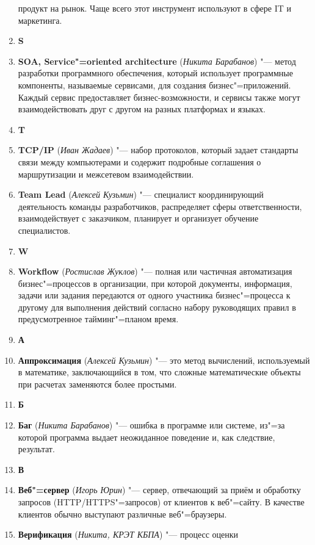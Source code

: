 \documentclass[a4paper, 14 pt]{extarticle}
\begin{document}
\begin{enumerate}
    продукт на рынок. Чаще всего этот инструмент используют в сфере IT и 
    маркетинга. 
    \item[] \textbf{S}
    \item \textbf{SOA, Service"=oriented architecture} 
    (\textit{Никита Барабанов}) "---  метод разработки программного обеспечения,
    который использует программные компоненты, называемые сервисами, для 
    создания бизнес"=приложений. Каждый сервис предоставляет бизнес-возможности,
    и сервисы также могут взаимодействовать друг с другом на разных платформах и
    языках.
    \item[] \textbf{T}
    \item \textbf{TCP/IP} (\textit{Иван Жадаев}) "--- набор протоколов, который 
    задает стандарты связи между компьютерами и содержит подробные соглашения о 
    маршрутизации и межсетевом взаимодействии.
    \item \textbf{Team Lead} (\textit{Алексей Кузьмин}) "--- специалист 
    координирующий деятельность команды разработчиков, распределяет сферы 
    ответственности, взаимодействует с заказчиком, планирует и организует 
    обучение специалистов.
    \item[] \textbf{W}
    \item \textbf{Workflow} (\textit{Ростислав Жуклов}) "--- полная или 
    частичная автоматизация бизнес"=процессов в организации, при которой 
    документы, информация, задачи или задания передаются от одного участника 
    бизнес"=процесса к другому для выполнения действий согласно набору 
    руководящих правил в предусмотренное тайминг"=планом время. 
    \item[] \textbf{А}
    \item \textbf{Аппроксимация} (\textit{Алексей Кузьмин}) "--- это метод 
    вычислений, используемый в математике, заключающийся в том, что сложные 
    математические объекты при расчетах заменяются более простыми. 
    \item[] \textbf{Б} 
    \item \textbf{Баг} (\textit{Никита Барабанов}) "--- ошибка в программе или 
    системе, из"=за которой программа выдает неожиданное поведение и, как 
    следствие, результат.   
    \item[] \textbf{В} 
    \item \textbf{Веб"=сервер} (\textit{Игорь Юрин}) "--- сервер, отвечающий за 
    приём и обработку запросов (HTTP/HTTPS"=запросов) от клиентов к веб"=сайту. 
    В качестве клиентов обычно выступают различные веб"=браузеры.
    \item \textbf{Верификация} (\textit{Никита, КРЭТ КБПА}) "--- процесс оценки 

\end{enumerate}
\end{document}
